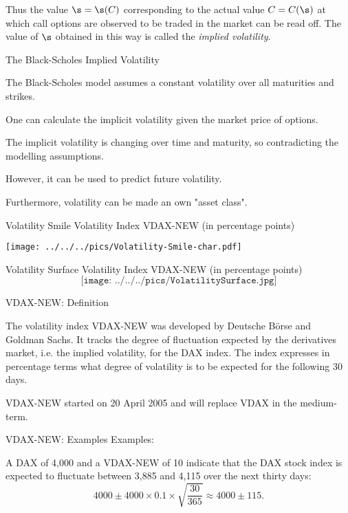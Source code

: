 	Thus the value $\s = \s(C)$ corresponding to the actual value $C =
C(\s)$ at which call options are observed to be traded in the
market can be read off.  The value of $\s$ obtained in this way is
called the {\it implied volatility}.


{The Black-Scholes Implied Volatility}


	The Black-Scholes model assumes a constant volatility over all maturities and strikes.

	One can calculate the implicit volatility given the market price of options.

	The implicit volatility is changing over time and maturity, so contradicting the modelling assumptions.

	However, it can be used to predict future volatility.

	Furthermore, volatility can be made an own "asset class".


{Volatility Smile}
Volatility Index VDAX-NEW (in percentage points)
\begin{center}
\texttt{[image: ../../../pics/Volatility-Smile-char.pdf]}
\end{center}

{Volatility Surface}
Volatility Index VDAX-NEW (in percentage points)
$$\texttt{[image: ../../../pics/VolatilitySurface.jpg]}$$

{VDAX-NEW: Definition}


	The volatility index VDAX-NEW was developed by Deutsche B{\"o}rse and
Goldman Sachs. It tracks the degree of fluctuation expected by the
derivatives market, i.e. the implied volatility, for the DAX index. The
index expresses in percentage terms what degree of volatility is to be
expected for the following 30 days.

	VDAX-NEW started on 20 April 2005 and will replace VDAX in the medium-term.


{VDAX-NEW: Examples}
Examples:\\
\vspace{0.3cm}


	A DAX of 4,000 and a VDAX-NEW of 10 indicate that the DAX stock index is
expected to fluctuate between 3,885 and 4,115 over the next thirty days:
$$4000\pm4000\times0.1\times\sqrt{\frac{30}{365}}\approx4000\pm115.$$

